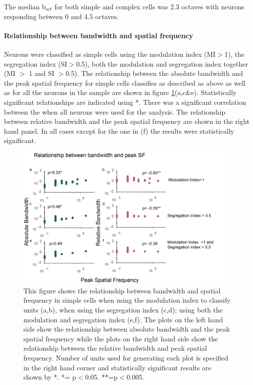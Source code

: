 	The median b$_{oct}$ for both simple and complex cells was 2.3 octaves with neurons responding between 0 and 4.5 octaves. 
	\paragraph{Relationship between bandwidth and spatial frequency}
	
	Neurons were classified as simple cells using the modulation index (MI$>$1), the segregation index (SI$>$0.5), both the modulation and segregation index together (MI $>$ 1 and SI $>$0.5). The relationship between the absolute bandwidth and the peak spatial frequency for simple cells classifies as described as above as well as for all the neurons in the sample are shown in figure \ref{fig:hwpksf}(a,c\&e). Statistically significant relationships are indicated using $*$. There was a significant correlation between the when all neurons were used for the analysis. The relationship between relative bandwidth and the peak spatial frequency are shown in the right hand panel. In all cases except for the one in (f) the results were statistically significant.
	
		\begin{figure}[H]
		
		\includegraphics[width=\linewidth]{LinearV1/hwpksf2.jpg}
		\caption{This figure shows the relationship between bandwidth and spatial frequency in simple cells when using the modulation index to classify units (a,b), when using the segregation index (c,d); using both the modulation and segregation index (e,f). The plots on the left hand side show the relationship between absolute bandwidth and the peak spatial frequency while the plots on the right hand side show the relationship between the relative bandwidth and peak spatial frequency. Number of units used for generating each plot is specified in the right hand corner and statistically significant results are shown by *. *= p$<$0.05. **=p$<$0.005.}
		\label{fig:hwpksf}
		\end{figure}
	
